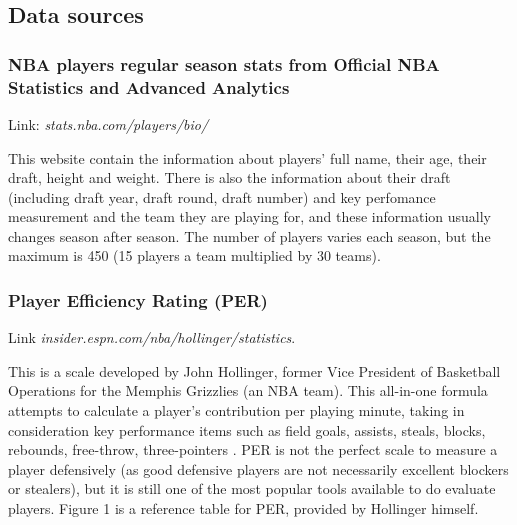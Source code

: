 \documentclass[a4paper,12pt,twoside]{article}
\numberwithin{equation}{section}
\begin{document}
\subsection{Data sources}
\subsubsection{NBA players regular season stats from Official NBA Statistics and Advanced Analytics}Link: \textit{stats.nba.com/players/bio/} 

This website contain the information about players' full name, their age, their draft, height and weight. There is also the information about their draft (including draft year, draft round, draft number) and key perfomance measurement and the team they are playing for, and these information usually changes season after season. The number of players varies each season, but the maximum is 450 (15 players a team multiplied by 30 teams).


\subsubsection{Player Efficiency Rating (PER)} 
Link \textit{insider.espn.com/nba/hollinger/statistics}.

This is a scale developed by John Hollinger, former Vice President of Basketball Operations for the Memphis Grizzlies (an NBA team). This all-in-one formula attempts to calculate a player's contribution per playing minute, taking in consideration key performance items such as field goals, assists, steals, blocks, rebounds, free-throw, three-pointers \cite{wiper}. PER is not the perfect scale to measure a player defensively (as good defensive players are not necessarily excellent blockers or stealers), but it is still one of the most popular tools available to do evaluate players. Figure 1 is a reference table for PER, provided by Hollinger himself.
\end{document}
